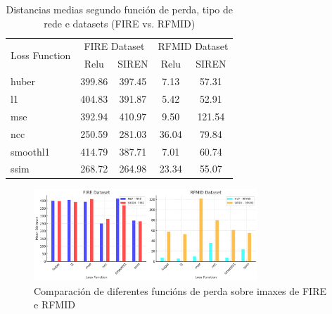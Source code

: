 

\begin{table}[h]
    \centering
    \begin{tabular}{|l|cc|cc|}
    \hline
    \multirow{2}{*}{Loss Function} & \multicolumn{2}{c|}{FIRE Dataset} & \multicolumn{2}{c|}{RFMID Dataset} \\ \cline{2-5}
     & Relu & SIREN & Relu & SIREN \\ \hline
    huber & 399.86 & 397.45 & 7.13 & 57.31 \\ \hline
    l1 & 404.83 & 391.87 & 5.42 & 52.91 \\ \hline
    mse & 392.94 & 410.97 & 9.50 & 121.54 \\ \hline
    ncc & 250.59 & 281.03 & 36.04 & 79.84 \\ \hline
    smoothl1 & 414.79 & 387.71 & 7.01 & 60.74 \\ \hline
    ssim & 268.72 & 264.98 & 23.34 & 55.07 \\ \hline
    \end{tabular}
    \caption{Distancias medias segundo función de perda, tipo de rede e datasets (FIRE vs. RFMID)}
    \label{tab:mean_distances}
\end{table}

\begin{figure}[h]
    \centering
    \includegraphics[width=0.75\textwidth]{imaxes/losstype.png}
    \caption{Comparación de diferentes funcións de perda sobre imaxes de FIRE e RFMID}
    \label{fig:loss_functions_comparison}
\end{figure}
    



